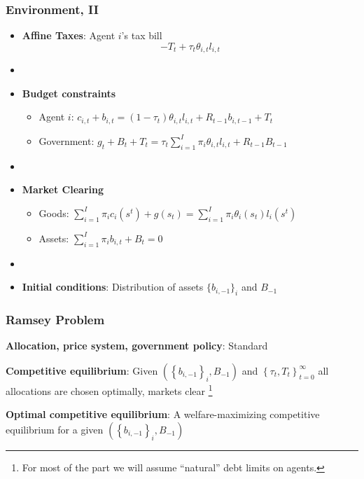 \documentclass{beamer}
\begin{document}
\begin{frame}
 \frametitle{Environment, II}
 \begin{itemize}
  \item \textbf{Affine Taxes}: Agent $i$'s tax bill
\[- T_t + \tau_t \theta_{i,t}l_{i,t}\]

\item[]
  \item \textbf{Budget constraints}
  \begin{itemize}
   \item Agent $i$: $ c_{i,t}+b_{i,t}=\left( 1-\tau _{t}\right) \theta _{i,t}l_{i,t}+R_{t-1}b_{i,t-1}+T_{t}$
\item Government: $g_{t}+B_{t}+T_t=\tau _{t}\sum_{i=1}^{I}\pi _{i}\theta_{i,t}l_{i,t}+R_{t-1}B_{t-1}$
  \end{itemize}

\item[]
  \item \textbf{Market Clearing}
  \begin{itemize}
   \item Goods: $\sum_{i=1}^{I}\pi_{i}c_{i}(s^t)+g\left( s_{t}\right) =\sum_{i=1}^{I}\pi
_{i}\theta _{i}\left( s_{t}\right) l_{i}(s^t)$

   \item Assets: $\sum_{i=1}^{I}\pi _{i}b_{i,t}+B_{t}=0$

  \end{itemize}
  \item[]

\item \textbf{Initial conditions}: Distribution of assets $\{b_{i,-1}\}_i$ and $B_{-1}$
\end{itemize}
\end{frame}


\begin{frame}
 \frametitle{Ramsey Problem}

\begin{definition}
\textbf{Allocation, price system, government policy}: Standard

\end{definition}

\begin{definition}
\textbf{Competitive equilibrium}: Given $\left( \left\{ b_{i,-1}\right\}
_{i},B_{-1}\right) $ and $\left\{ \tau _{t},T_{t}\right\} _{t=0}^{\infty }$
all allocations are chosen optimally, markets clear \footnote{For most of the part we will assume ``natural'' debt limits on agents. }
\end{definition}

\begin{definition}
\textbf{Optimal competitive equilibrium}: A welfare-maximizing competitive
equilibrium for a given $\left( \left\{ b_{i,-1}\right\} _{i},B_{-1}\right) $
\end{definition}

 \end{frame}
\end{document}

